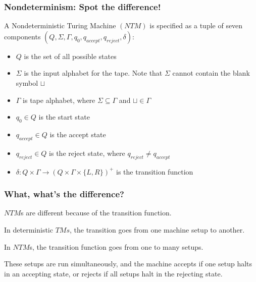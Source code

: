 \documentclass[aspectratio=169]{beamer}
\begin{document}
\begin{frame}
\frametitle{Nondeterminism: Spot the difference!}
A Nondeterministic Turing Machine $(NTM)$ is specified as a tuple of seven components $(Q, \Sigma, \Gamma, q_0, q_{accept}, q_{reject}, \delta)$:

\begin{itemize}
    \item<1-> $Q$ is the set of all possible states
    \item<2-> $\Sigma$ is the input alphabet for the tape. Note that $\Sigma$ cannot contain the blank symbol $\sqcup$
    \item<3-> $\Gamma$ is tape alphabet, where $\Sigma \subseteq \Gamma$ and $\sqcup \in \Gamma$
    \item<4-> $q_0 \in Q$ is the start state
    \item<5-> $q_{accept} \in Q$ is the accept state
    \item<6-> $q_{reject} \in Q$ is the reject state, where $q_{reject} \neq q_{accept}$
    \item<7-> $\delta: Q \times \Gamma \to (Q \times \Gamma \times \{L, R\})^+$ is the transition function
\end{itemize}
\end{frame}

\begin{frame}
\frametitle{What, what's the difference?}
$NTM$s are different because of the transition function.

In deterministic $TMs$, the transition goes from one machine setup to another.

In $NTM$s, the transition function goes from one to many setups.

These setups are run simultaneously, and the machine accepts if one setup halts in an accepting state, or rejects if all setups halt in the rejecting state.

\begin{center}
\end{center}
\end{frame}
\end{document}
